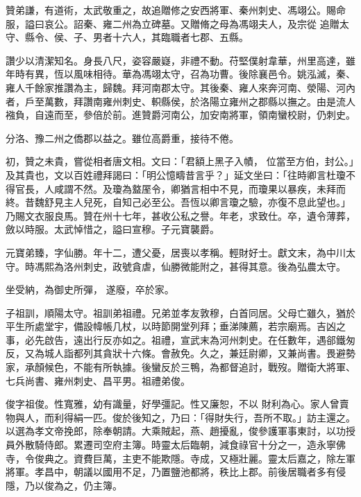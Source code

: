 \begin{pinyinscope}
 贊弟謙，有道術，太武敬重之，故追贈修之安西將軍、秦州刺史、馮翊公。賜命服，謚曰哀公。詔秦、雍二州為立碑墓。又贈脩之母為馮翊夫人，及宗從
 追贈太守、縣令、侯、子、男者十六人，其臨職者七郡、五縣。



 讚少以清潔知名。身長八尺，姿容嚴嶷，非禮不動。苻堅僕射韋華，州里高達，雖年時有異，恆以風味相待。華為馮翊太守，召為功曹。後除襄邑令。姚泓滅，秦、雍人千餘家推讚為主，歸魏。拜河南郡太守。其後秦、雍人來奔河南、滎陽、河內者，戶至萬數，拜讚南雍州刺史、軹縣侯，於洛陽立雍州之郡縣以撫之。由是流人襁負，自遠而至，參倍於前。進贊爵河南公，加安南將軍，領南蠻校尉，仍刺史。



 分洛、豫二州之僑郡以益之。雖位高爵重，接待不倦。



 初，贊之未貴，嘗從相者唐文相。文曰：「君額上黑子入幘，
 位當至方伯，封公。」及其貴也，文以百姓禮拜謁曰：「明公憶疇昔言乎？」延文坐曰：「往時卿言杜瓊不得官長，人咸謂不然。及瓊為盩厔令，卿猶言相中不見，而瓊果以暴疾，未拜而終。昔魏舒見主人兒死，自知己必至公。吾恆以卿言瓊之驗，亦復不息此望也。」乃賜文衣服良馬。贊在州十七年，甚收公私之譽。年老，求致仕。卒，遺令薄葬，斂以時服。太武悼惜之，謚曰宣穆。子元寶襲爵。



 元寶弟臻，字仙勝。年十二，遭父憂，居喪以孝稱。輕財好士。獻文末，為中川太守。時馮熙為洛州刺史，政號貪虐，仙勝微能附之，甚得其意。後為弘農太守。



 坐受納，為御史所彈，
 遂廢，卒於家。



 子祖訓，順陽太守。祖訓弟祖禮。兄弟並孝友敦穆，白首同居。父母亡雖久，猶於平生所處堂宇，備設幃帳几杖，以時節開堂列拜；垂涕陳薦，若宗廟焉。吉凶之事，必先啟告，遠出行反亦如之。祖禮，宣武末為河州刺史。在任數年，遇郤鐵匆反，又為城人詣都列其貪狀十六條。會赦免。久之，兼廷尉卿，又兼尚書。畏避勢家，承顏候色，不能有所執據。後蠻反於三鴨，為都督追討，戰歿。贈衛大將軍、七兵尚書、雍州刺史、昌平男。祖禮弟俊。



 俊字祖俊。性寬雅，幼有識量，好學彊記。性又廉恕，不以
 財利為心。家人曾賣物與人，而利得絹一匹。俊於後知之，乃曰：「得財失行，吾所不取。」訪主還之。以選為孝文帝挽郎，除奉朝請。大乘賊起，燕、趙擾亂，俊參護軍事東討，以功授員外散騎侍郎。累遷司空府主簿。時靈太后臨朝，減食祿官十分之一，造永寧佛寺，令俊典之。資費巨萬，主吏不能欺隱。寺成，又極壯麗。靈太后嘉之，除左軍將軍。孝昌中，朝議以國用不足，乃置鹽池都將，秩比上郡。前後居職者多有侵隱，乃以俊為之，仍主簿。




\end{pinyinscope}
